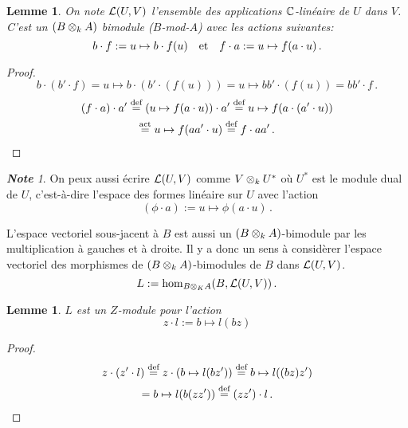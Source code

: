 \documentclass[francais,a4paper,11pt,reqno]{amsart}
\theoremstyle{plain}
\newtheorem{LEMME}[THEO]{\bf Lemme}
\theoremstyle{definition}
\theoremstyle{remark}
\newtheorem{NOTE}[THEO]{\bf Note}
\newcommand{\act}{\cdot}
\newcommand\eqcom[1]{\mathrel{\overset{\text{#1}}{=}}}
\begin{document}
\begin{LEMME}
  On note $\operatorname{\mathcal L}(U, V)$ l'ensemble des applications ${\mathbb C}$-linéaire de $U$ dans
  $V$. C'est un $(B\otimes_k A)$ bimodule ($B$-mod-$A$) avec les actions
  suivantes:
  \begin{equation}
    b\act f := u\mapsto b\act f(u)
    \qandq
    f\act a := u\mapsto f(a\act u)\,.
  \end{equation}
\end{LEMME}
\begin{proof}
  \begin{equation}
    b\act (b'\act f) = u\mapsto b \act (b'\act(f(u)))
    = u\mapsto b b'\act(f(u)) = bb'\act f\,.
  \end{equation}
  \begin{multline}
    (f\act a) \act a'
    \eqcom{def}(u\mapsto f(a\act u)) \act a'
    \eqcom{def}u\mapsto f(a\act (a' \act u))\\
    \eqcom{act}u\mapsto f(aa'\act u)
    \eqcom{def}f\act aa'\,.\qedhere
  \end{multline}
\end{proof}
\begin{NOTE}
  On peux aussi écrire $\operatorname{\mathcal L}(U, V)$ comme $V\otimes_k U^*$ où $U^*$ est le
  module dual de $U$, c'est-à-dire l'espace des formes linéaire sur $U$ avec
  l'action
  \begin{equation}
  (\phi\act a) := u\mapsto \phi(a\act u)\,.
\end{equation}
\end{NOTE}
\bigskip

L'espace vectoriel sous-jacent à $B$ est aussi un $(B\otimes_k A)$-bimodule
par les multiplication à gauches et à droite. Il y a donc un sens à considèrer
l'espace vectoriel des morphismes de $(B\otimes_k A)$-bimodules de $B$ dans
$\operatorname{\mathcal L}(U,V)$.
\begin{equation}
  L := \hom_{B\otimes_K A}(B, \operatorname{\mathcal L}(U, V))\,.
\end{equation}
\begin{LEMME}
  $L$ est un $Z$-module pour l'action
  \begin{equation}
    z\act l := b\mapsto l(bz)
  \end{equation}
\end{LEMME}
\begin{proof}
  \begin{multline}
    z\act(z'\act l)
    \eqcom{def}z\act(b \mapsto l(b z'))
    \eqcom{def}b \mapsto l((b z) z') \\
    =b \mapsto l(b (zz')) \eqcom{def}(zz') \act l\,.\qedhere
  \end{multline}
\end{proof}
\end{document}
